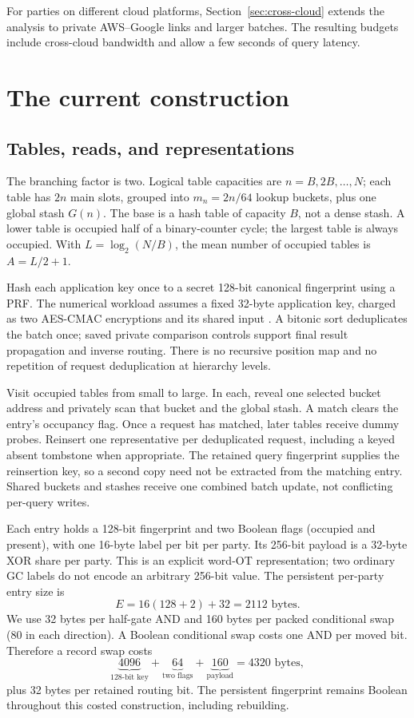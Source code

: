 \documentclass[11pt]{article}
\begin{document}
For parties on different cloud platforms, Section~\ref{sec:cross-cloud}
extends the analysis to private AWS--Google links and larger batches.
The resulting budgets include cross-cloud bandwidth and allow a few
seconds of query latency.

\section{The current construction}
\subsection{Tables, reads, and representations}
The branching factor is two. Logical table capacities are
$n=B,2B,\ldots,N$; each table has $2n$ main slots, grouped into
$m_n=2n/64$ lookup buckets, plus one global stash $G(n)$. The base is a
hash table of capacity $B$, not a dense stash. A lower table is occupied
half of a binary-counter cycle; the largest table is always occupied.
With $L=\log_2(N/B)$, the mean number of occupied tables is $A=L/2+1$.

Hash each application key once to a secret 128-bit canonical fingerprint
using a PRF. The numerical workload assumes a fixed 32-byte application
key, charged as two AES-CMAC encryptions and its shared input \cite{nist-cmac}. A bitonic
sort deduplicates the batch once; saved private comparison controls support
final result propagation and inverse routing. There is no recursive
position map and no repetition of request deduplication at hierarchy levels.

Visit occupied tables from small to large. In each, reveal one selected
bucket address and privately scan that bucket and the global stash. A
match clears the entry's occupancy flag. Once a request has matched, later
tables receive dummy probes. Reinsert one representative per deduplicated
request, including a keyed absent tombstone when appropriate. The retained
query fingerprint supplies the reinsertion key, so a second copy need not
be extracted from the matching entry. Shared buckets and stashes receive
one combined batch update, not conflicting per-query writes.

Each entry holds a 128-bit fingerprint and two Boolean flags (occupied and
present), with one 16-byte label per bit per party. Its 256-bit payload is
a 32-byte XOR share per party. This is an explicit word-OT representation;
two ordinary GC labels do not encode an arbitrary 256-bit value. The
persistent per-party entry size is
\[
 E=16(128+2)+32=2112\text{ bytes}.
\]
We use 32 bytes per half-gate AND and 160 bytes per packed conditional swap
(80 in each direction). A Boolean conditional swap costs one AND per
moved bit. Therefore a record swap costs
\[
 \underbrace{4096}_{128\text{-bit key}}+
 \underbrace{64}_{\text{two flags}}+
 \underbrace{160}_{\text{payload}}=4320\text{ bytes},
\]
plus 32 bytes per retained routing bit. The persistent fingerprint remains
Boolean throughout this costed construction, including rebuilding.
\end{document}
